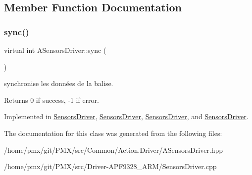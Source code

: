 \subsection{Member Function Documentation}
\mbox{\label{classASensorsDriver_a0c581029ba10d5ac820a9e3e2e6883cd}} 
\subsubsection{\texorpdfstring{sync()}{sync()}}
{\footnotesize\ttfamily virtual int A\+Sensors\+Driver\+::sync (\begin{DoxyParamCaption}{ }\end{DoxyParamCaption})\hspace{0.3cm}{\ttfamily [pure virtual]}}



synchronise les données de la balise. 

\begin{DoxyReturn}{Returns}
0 if success, -\/1 if error. 
\end{DoxyReturn}


Implemented in \hyperlink{classSensorsDriver_a1bfbcc82461257094ed185fa2017afad}{Sensors\+Driver}, \hyperlink{classSensorsDriver_a1bfbcc82461257094ed185fa2017afad}{Sensors\+Driver}, \hyperlink{classSensorsDriver_a1bfbcc82461257094ed185fa2017afad}{Sensors\+Driver}, and \hyperlink{classSensorsDriver_a1bfbcc82461257094ed185fa2017afad}{Sensors\+Driver}.



The documentation for this class was generated from the following files\+:\begin{DoxyCompactItemize}
\item 
/home/pmx/git/\+P\+M\+X/src/\+Common/\+Action.\+Driver/A\+Sensors\+Driver.\+hpp\item 
/home/pmx/git/\+P\+M\+X/src/\+Driver-\/\+A\+P\+F9328\+\_\+\+A\+R\+M/Sensors\+Driver.\+cpp\end{DoxyCompactItemize}
